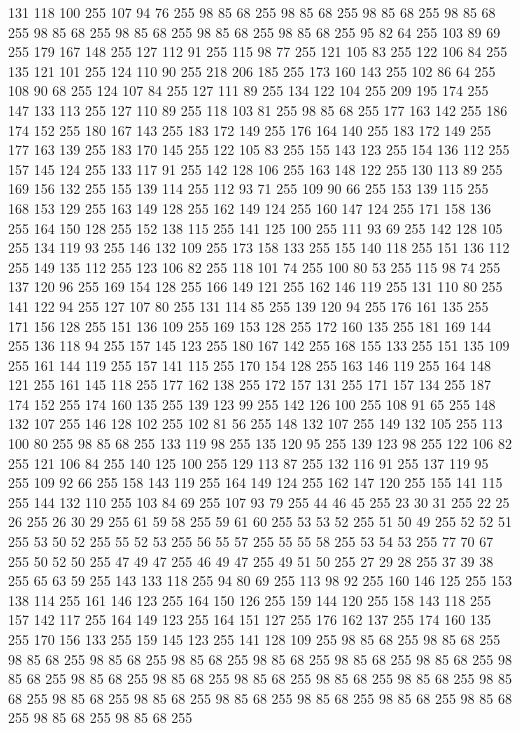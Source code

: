 131 118 100 255 107 94 76 255 98 85 68 255 98 85 68 255 98 85 68 255 98 85 68 255 98 85 68 255 98 85 68 255 98 85 68 255 98 85 68 255 95 82 64 255 103 89 69 255 179 167 148 255 127 112 91 255 115 98 77 255 121 105 83 255 122 106 84 255 135 121 101 255 124 110 90 255 218 206 185 255 173 160 143 255 102 86 64 255 108 90 68 255 124 107 84 255 127 111 89 255 134 122 104 255 209 195 174 255 147 133 113 255 127 110 89 255 118 103 81 255 98 85 68 255 177 163 142 255 186 174 152 255 180 167 143 255 183 172 149 255 176 164 140 255 183 172 149 255 177 163 139 255 183 170 145 255 122 105 83 255 155 143 123 255 154 136 112 255 157 145 124 255 133 117 91 255 142 128 106 255 163 148 122 255 130 113 89 255 169 156 132 255 155 139 114 255 112 93 71 255 109 90 66 255 153 139 115 255 168 153 129 255 163 149 128 255 162 149 124 255 160 147 124 255 171 158 136 255 164 150 128 255 152 138 115 255 141 125 100 255 111 93 69 255 142 128 105 255 134 119 93 255 146 132 109 255
173 158 133 255 155 140 118 255 151 136 112 255 149 135 112 255 123 106 82 255 118 101 74 255 100 80 53 255 115 98 74 255 137 120 96 255 169 154 128 255 166 149 121 255 162 146 119 255 131 110 80 255 141 122 94 255 127 107 80 255 131 114 85 255 139 120 94 255 176 161 135 255 171 156 128 255 151 136 109 255 169 153 128 255 172 160 135 255 181 169 144 255 136 118 94 255 157 145 123 255 180 167 142 255 168 155 133 255 151 135 109 255 161 144 119 255 157 141 115 255 170 154 128 255 163 146 119 255 164 148 121 255 161 145 118 255 177 162 138 255 172 157 131 255 171 157 134 255 187 174 152 255 174 160 135 255 139 123 99 255 142 126 100 255 108 91 65 255 148 132 107 255 146 128 102 255 102 81 56 255 148 132 107 255 149 132 105 255 113 100 80 255 98 85 68 255 133 119 98 255 135 120 95 255 139 123 98 255 122 106 82 255 121 106 84 255 140 125 100 255 129 113 87 255 132 116 91 255 137 119 95 255 109 92 66 255 158 143 119 255 164 149 124 255 162 147 120 255 155 141 115 255 144 132 110 255
103 84 69 255 107 93 79 255 44 46 45 255 23 30 31 255 22 25 26 255 26 30 29 255 61 59 58 255 59 61 60 255 53 53 52 255 51 50 49 255 52 52 51 255 53 50 52 255 55 52 53 255 56 55 57 255 55 55 58 255 53 54 53 255 77 70 67 255 50 52 50 255 47 49 47 255 46 49 47 255 49 51 50 255 27 29 28 255 37 39 38 255 65 63 59 255 143 133 118 255 94 80 69 255 113 98 92 255 160 146 125 255 153 138 114 255 161 146 123 255 164 150 126 255 159 144 120 255 158 143 118 255 157 142 117 255 164 149 123 255 164 151 127 255 176 162 137 255 174 160 135 255 170 156 133 255 159 145 123 255 141 128 109 255 98 85 68 255 98 85 68 255 98 85 68 255 98 85 68 255 98 85 68 255 98 85 68 255 98 85 68 255 98 85 68 255 98 85 68 255 98 85 68 255 98 85 68 255 98 85 68 255 98 85 68 255 98 85 68 255 98 85 68 255 98 85 68 255 98 85 68 255 98 85 68 255 98 85 68 255 98 85 68 255 98 85 68 255 98 85 68 255 98 85 68 255
